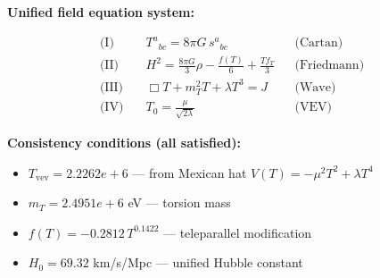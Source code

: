
\textbf{Unified field equation system:}

\begin{align}
  \text{(I)} \quad & T^a{}_{bc} = 8\pi G \, s^a{}_{bc} && \text{(Cartan)} \\
  \text{(II)} \quad & H^2 = \frac{8\pi G}{3}\rho - \frac{f(T)}{6} + \frac{Tf_T}{3} && \text{(Friedmann)} \\
  \text{(III)} \quad & \Box T + m_T^2 T + \lambda T^3 = J && \text{(Wave)} \\
  \text{(IV)} \quad & T_0 = \frac{\mu}{\sqrt{2\lambda}} && \text{(VEV)}
\end{align}

\textbf{Consistency conditions (all satisfied):}
\begin{itemize}
  \item $T_{\text{vev}} = 2.2262e+6$ — from Mexican hat $V(T) = -\mu^2 T^2 + \lambda T^4$
  \item $m_T = 2.4951e+6$ eV — torsion mass
  \item $f(T) = -0.2812 \, T^{0.1422}$ — teleparallel modification
  \item $H_0 = 69.32$ km/s/Mpc — unified Hubble constant
\end{itemize}